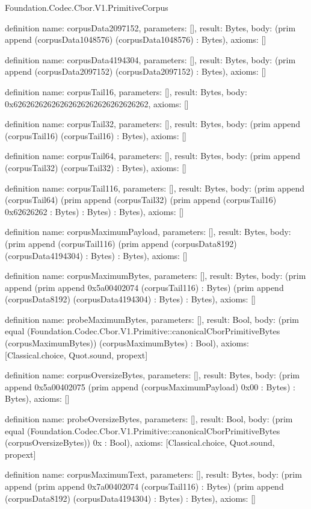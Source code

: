 \begin{lexlean}{Foundation.Codec.Cbor.V1.PrimitiveCorpus}
\begin{semanticmodule}
definition{
  name: corpusData2097152,
  parameters: [],
  result: Bytes,
  body: (prim append (corpusData1048576) (corpusData1048576) : Bytes),
  axioms: []
}

definition{
  name: corpusData4194304,
  parameters: [],
  result: Bytes,
  body: (prim append (corpusData2097152) (corpusData2097152) : Bytes),
  axioms: []
}

definition{
  name: corpusTail16,
  parameters: [],
  result: Bytes,
  body: 0x62626262626262626262626262626262,
  axioms: []
}

definition{
  name: corpusTail32,
  parameters: [],
  result: Bytes,
  body: (prim append (corpusTail16) (corpusTail16) : Bytes),
  axioms: []
}

definition{
  name: corpusTail64,
  parameters: [],
  result: Bytes,
  body: (prim append (corpusTail32) (corpusTail32) : Bytes),
  axioms: []
}

definition{
  name: corpusTail116,
  parameters: [],
  result: Bytes,
  body: (prim append (corpusTail64) (prim append (corpusTail32) (prim append (corpusTail16) 0x62626262 : Bytes) : Bytes) : Bytes),
  axioms: []
}

definition{
  name: corpusMaximumPayload,
  parameters: [],
  result: Bytes,
  body: (prim append (corpusTail116) (prim append (corpusData8192) (corpusData4194304) : Bytes) : Bytes),
  axioms: []
}

definition{
  name: corpusMaximumBytes,
  parameters: [],
  result: Bytes,
  body: (prim append (prim append 0x5a00402074 (corpusTail116) : Bytes) (prim append (corpusData8192) (corpusData4194304) : Bytes) : Bytes),
  axioms: []
}

definition{
  name: probeMaximumBytes,
  parameters: [],
  result: Bool,
  body: (prim equal (Foundation.Codec.Cbor.V1.Primitive::canonicalCborPrimitiveBytes (corpusMaximumBytes)) (corpusMaximumBytes) : Bool),
  axioms: [Classical.choice, Quot.sound, propext]
}

definition{
  name: corpusOversizeBytes,
  parameters: [],
  result: Bytes,
  body: (prim append 0x5a00402075 (prim append (corpusMaximumPayload) 0x00 : Bytes) : Bytes),
  axioms: []
}

definition{
  name: probeOversizeBytes,
  parameters: [],
  result: Bool,
  body: (prim equal (Foundation.Codec.Cbor.V1.Primitive::canonicalCborPrimitiveBytes (corpusOversizeBytes)) 0x : Bool),
  axioms: [Classical.choice, Quot.sound, propext]
}

definition{
  name: corpusMaximumText,
  parameters: [],
  result: Bytes,
  body: (prim append (prim append 0x7a00402074 (corpusTail116) : Bytes) (prim append (corpusData8192) (corpusData4194304) : Bytes) : Bytes),
  axioms: []
}


\end{semanticmodule}
\end{lexlean}

